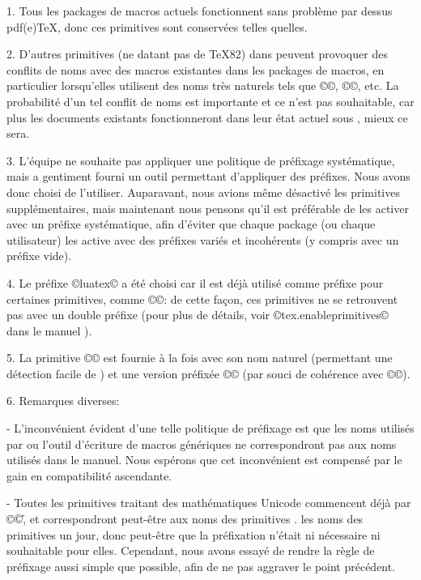 \documentclass{lltxdoc}
\begin{document}
1. Tous les packages de macros actuels fonctionnent sans problème par dessus pdf(e)TeX, donc ces primitives sont conservées telles quelles.

2. D'autres primitives (ne datant pas de TeX82) dans \luatex peuvent provoquer des conflits de noms avec des macros existantes dans les packages de macros, en particulier lorsqu'elles utilisent des noms très \og{}naturels\fg{} tels que ©\outputbox©, ©\mathstyle©, etc. La probabilité d'un tel conflit de noms est importante et ce n'est pas souhaitable, car plus les documents \latex existants fonctionneront dans leur état actuel sous \luatex, mieux ce sera.

3. L'équipe \luatex ne souhaite pas appliquer une politique de préfixage systématique, mais a gentiment fourni un outil permettant d'appliquer des préfixes. Nous avons donc choisi de l'utiliser. Auparavant, nous avions même désactivé les primitives supplémentaires, mais maintenant nous pensons qu'il est préférable de les activer avec un préfixe systématique, afin d'éviter que chaque package (ou chaque utilisateur) les active avec des préfixes variés et incohérents (y compris avec un préfixe vide).

4. Le préfixe ©luatex© a été choisi car il est déjà utilisé comme préfixe pour certaines primitives, comme ©\luatexversion©: de cette façon, ces primitives ne se retrouvent pas avec un double préfixe (pour plus de détails, voir ©tex.enableprimitives© dans le manuel \luatex).

5. La primitive ©\directlua© est fournie à la fois avec son nom naturel (permettant une détection facile de \luatex) et une version préfixée ©\luatexdirectlua© (par souci de cohérence avec ©\luatexlatelua©).

6. Remarques diverses:

- L'inconvénient évident d'une telle politique de préfixage est que les noms utilisés par \latex ou l'outil d'écriture de macros génériques ne correspondront pas aux noms utilisés dans le manuel. Nous espérons que cet inconvénient est compensé par le gain en compatibilité ascendante.

- Toutes les primitives traitant des mathématiques Unicode commencent déjà par ©\U©, et correspondront peut-être aux noms des primitives \xetex. les noms des primitives \xetex un jour, donc peut-être que la préfixation n'était ni nécessaire ni souhaitable pour elles. Cependant, nous avons essayé de rendre la règle de préfixage aussi simple que possible, afin de ne pas aggraver le point précédent.
\end{document}
